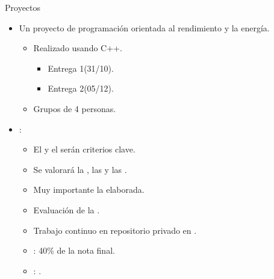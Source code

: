 \begin{frame}[t]{Proyectos}
\begin{itemize}
  \item Un proyecto de programación orientada al rendimiento y la energía.
    \begin{itemize}
      \item Realizado usando C++.
        \begin{itemize}
          \item Entrega 1(31/10).
          \item Entrega 2(05/12).
        \end{itemize}
      \item Grupos de 4 personas.
    \end{itemize}

  \item {}:
    \begin{itemize}
      \item El  y el  serán criterios clave.
      \item Se valorará la , las 
             y las .
      \item Muy importante la  elaborada.
      \item Evaluación de la .
      \item Trabajo continuo en repositorio privado en .
      \item {}: 40\% de la nota final.
      \item {}: .
    \end{itemize}
\end{itemize}
\end{frame}

